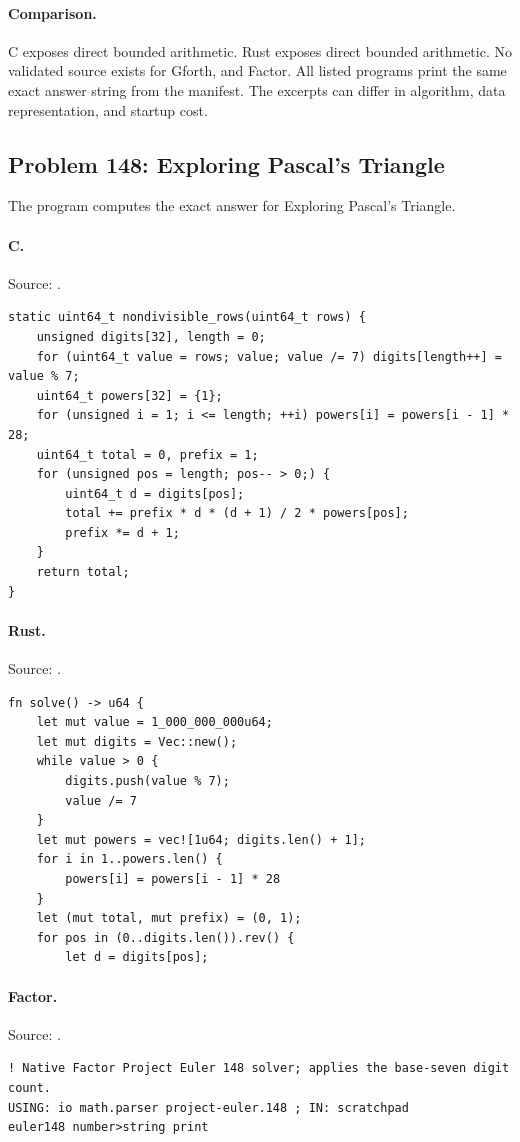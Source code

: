 \paragraph{Comparison.}
C exposes direct bounded arithmetic. Rust exposes direct bounded arithmetic.
No validated source exists for Gforth, and Factor.
All listed programs print the same exact answer string from the manifest. The excerpts can differ in algorithm, data representation, and startup cost.

\subsection{Problem 148: Exploring Pascal's Triangle}
\label{walkthrough:p148}
The program computes the exact answer for Exploring Pascal's Triangle.

\paragraph{C.} Source: .
\begin{lstlisting}
static uint64_t nondivisible_rows(uint64_t rows) {
    unsigned digits[32], length = 0;
    for (uint64_t value = rows; value; value /= 7) digits[length++] = value % 7;
    uint64_t powers[32] = {1};
    for (unsigned i = 1; i <= length; ++i) powers[i] = powers[i - 1] * 28;
    uint64_t total = 0, prefix = 1;
    for (unsigned pos = length; pos-- > 0;) {
        uint64_t d = digits[pos];
        total += prefix * d * (d + 1) / 2 * powers[pos];
        prefix *= d + 1;
    }
    return total;
}
\end{lstlisting}

\paragraph{Rust.} Source: .
\begin{lstlisting}
fn solve() -> u64 {
    let mut value = 1_000_000_000u64;
    let mut digits = Vec::new();
    while value > 0 {
        digits.push(value % 7);
        value /= 7
    }
    let mut powers = vec![1u64; digits.len() + 1];
    for i in 1..powers.len() {
        powers[i] = powers[i - 1] * 28
    }
    let (mut total, mut prefix) = (0, 1);
    for pos in (0..digits.len()).rev() {
        let d = digits[pos];
\end{lstlisting}

\paragraph{Factor.} Source: .
\begin{lstlisting}
! Native Factor Project Euler 148 solver; applies the base-seven digit count.
USING: io math.parser project-euler.148 ; IN: scratchpad
euler148 number>string print
\end{lstlisting}

